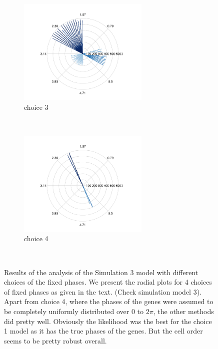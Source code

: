 \documentclass[11pt]{article}
\begin{document}
\begin{figure}[ht]
     \begin{subfigure}[t]{0.5\textwidth}
        \centering
        \includegraphics[height=2in]{../figures/cell_order_R_figs/et_cell_order_sim3_choice3.png}
        \caption{choice 3}
    \end{subfigure}%
    ~
       \begin{subfigure}[t]{0.5\textwidth}
        \centering
        \includegraphics[height=2in]{../figures/cell_order_R_figs/et_cell_order_sim3_choice4.png}
        \caption{choice 4}
    \end{subfigure}\\
  \caption{Results of the analysis of the Simulation 3 model with different choices of the fixed phases. We present the radial plots for 4 choices of fixed phases as given in the text. (Check simulation model 3). Apart from choice 4, where the phases of the genes were assumed to be completely uniformly distributed over $0$ to $2 \pi$, the other methods did pretty well. Obviously the likelihood was the best for the choice 1 model as it has the true phases of the genes. But the cell order seems to be pretty robust overall.}
 \label{fig:fig9}
 \end{figure}
\end{document}
